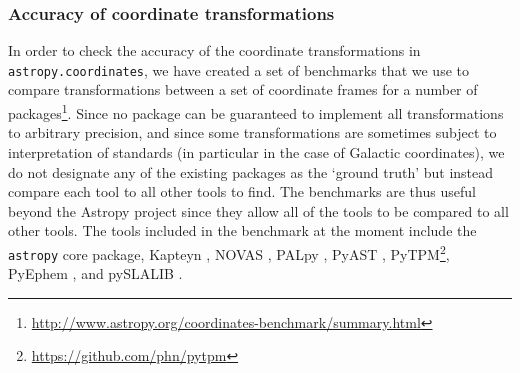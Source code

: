 \documentclass[modern]{aastex61}
\newcommand{\package}[1]{\texttt{#1}\xspace}
\newcommand{\astropy}{Astropy\xspace}
\newcommand{\astropypkg}{\package{astropy}}
\begin{document}
\subsubsection{Accuracy of coordinate transformations}

In order to check the accuracy of the coordinate transformations in \package{astropy.coordinates}, we have created a set of benchmarks that we use to compare transformations between a set of coordinate frames for a number of packages\footnote{\url{http://www.astropy.org/coordinates-benchmark/summary.html}}. Since
no package can be guaranteed to implement all transformations to arbitrary precision, and since some transformations are sometimes subject to interpretation of standards (in particular in the case of Galactic coordinates), we do not designate any of the existing packages as the `ground truth' but instead compare each tool to all other tools to find. The benchmarks are thus useful beyond the \astropy project since they allow all of the tools to be compared to all other tools. The tools included in the benchmark at the moment include the \astropypkg core package, Kapteyn \citep{kapteyn}, NOVAS \citep{novas}, PALpy \citep{pal}, PyAST \citep[a wrapper for AST, described in][]{ast}, PyTPM\footnote{\url{https://github.com/phn/pytpm}}, PyEphem \citep{pyephem}, and pySLALIB \citep[a Python wrapper for SLALIB, described in][]{slalib}.
\end{document}
